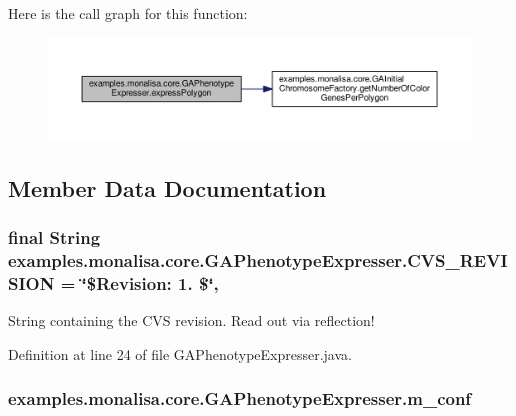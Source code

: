 Here is the call graph for this function\-:
\nopagebreak
\begin{figure}[H]
\begin{center}
\leavevmode
\includegraphics[width=350pt]{classexamples_1_1monalisa_1_1core_1_1_g_a_phenotype_expresser_a8e2fa1f8051007bc7cad53f6edb3cdb4_cgraph}
\end{center}
\end{figure}




\subsection{Member Data Documentation}
\hypertarget{classexamples_1_1monalisa_1_1core_1_1_g_a_phenotype_expresser_a54392e4e1a103109a552c5245cbab741}{
\subsubsection[{C\-V\-S\-\_\-\-R\-E\-V\-I\-S\-I\-O\-N}]{\setlength{\rightskip}{0pt plus 5cm}final String examples.\-monalisa.\-core.\-G\-A\-Phenotype\-Expresser.\-C\-V\-S\-\_\-\-R\-E\-V\-I\-S\-I\-O\-N = \char`\"{}\$Revision\-: 1. \$\char`\"{}\hspace{0.3cm}{\ttfamily [static]}, {\ttfamily [private]}}}\label{classexamples_1_1monalisa_1_1core_1_1_g_a_phenotype_expresser_a54392e4e1a103109a552c5245cbab741}
String containing the C\-V\-S revision. Read out via reflection! 

Definition at line 24 of file G\-A\-Phenotype\-Expresser.\-java.

\hypertarget{classexamples_1_1monalisa_1_1core_1_1_g_a_phenotype_expresser_aee9757424a4462c17cab1255b30499e6}{
\subsubsection[{m\-\_\-conf}]{ examples.\-monalisa.\-core.\-G\-A\-Phenotype\-Expresser.\-m\-\_\-conf\hspace{0.3cm}{\ttfamily [private]}}}\label{classexamples_1_1monalisa_1_1core_1_1_g_a_phenotype_expresser_aee9757424a4462c17cab1255b30499e6}


